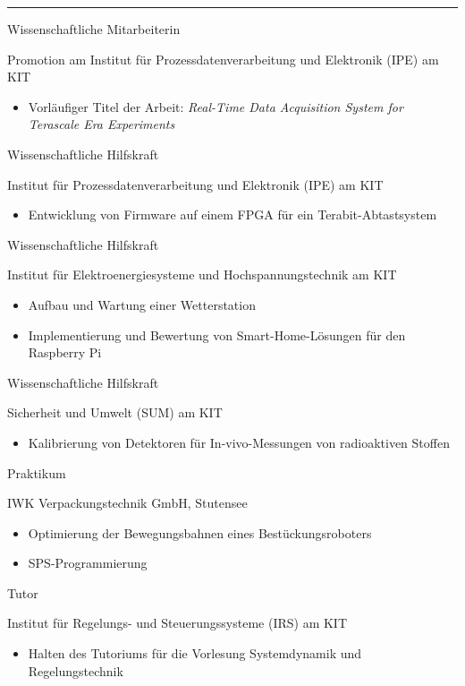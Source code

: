 \documentclass[a4paper,10pt]{article}
\newlength{\cvcolumngapwidth}
\newlength{\cvleftcolumnwidth}
\newlength{\cvrightcolumnwidth}
\newcommand{\cvsectionstyle}[1]{{\normalsize\textcolor{cvsectioncolor}{#1}}}
\newcommand{\cvtitlestyle}[1]{{\large\textcolor{cvtitlecolor}{#1}}}
\newcommand{\cvdurationstyle}[1]{{\small\textcolor{cvdurationcolor}{#1}}}
\newlength{\cvafteritemskipamount}
\newlength{\cvaftersectionskipamount}
\newlength{\cvaftertitleskipamount}
\newlength{\cvparskip}
\newcommand{\cvsection}[1]{
    \begin{minipage}[t][][b]{\cvleftcolumnwidth}
        \raggedleft\cvsectionstyle{#1}
    \end{minipage}%
    \hspace{\cvcolumngapwidth}%
    \begin{minipage}[t]{\cvrightcolumnwidth}
        \textcolor{cvrulecolor}{\rule{\cvrightcolumnwidth}{0.3mm}}
    \end{minipage}

    \vspace{\cvaftersectionskipamount}
}
\newcommand{\cvitem}[2]{
    \begin{minipage}[t]{\cvleftcolumnwidth}
    \strut\vspace*{-\baselineskip}\newline %
    \raggedleft #1
    \end{minipage}%
    \hspace{\cvcolumngapwidth}%
    \begin{minipage}[t]{\cvrightcolumnwidth}
        \setlength{\parskip}{\cvparskip}
        \strut\vspace*{-\baselineskip}\newline #2 %
    \end{minipage}

    \vspace{\cvafteritemskipamount}
}
\newcommand{\cvtitle}[1]{
    \cvtitlestyle{#1}

    \vspace{\cvaftertitleskipamount}
    \vspace{-\cvparskip}
}
\begin{document}
\cvsection{BERUFLICHE ERFAHRUNG}

\cvitem{\cvdurationstyle{April 2022 -- heute}}{\cvtitle{Wissenschaftliche Mitarbeiterin}
	Promotion am Institut für Prozessdatenverarbeitung und Elektronik (IPE) am KIT
	\begin{itemize}[leftmargin=*]
		\item Vorläufiger Titel der Arbeit: \textit{Real-Time Data Acquisition System for Terascale Era Experiments}
	\end{itemize}
}

\cvitem{\cvdurationstyle{September 2021 -- März 2022}}{\cvtitle{Wissenschaftliche Hilfskraft}
	Institut für Prozessdatenverarbeitung und Elektronik (IPE) am KIT
	\begin{itemize}[leftmargin=*]
		\item Entwicklung von Firmware auf einem FPGA für ein Terabit-Abtastsystem
	\end{itemize}
}

\cvitem{\cvdurationstyle{Mai 2017 -- Juni 2021}}{\cvtitle{Wissenschaftliche Hilfskraft}
	Institut für Elektroenergiesysteme und Hochspannungstechnik am KIT
	\begin{itemize}[leftmargin=*]
		\item Aufbau und Wartung einer Wetterstation
		\item Implementierung und Bewertung von Smart-Home-Lösungen für den Raspberry Pi
	\end{itemize}
}

\cvitem{\cvdurationstyle{Oktober 2018 -- Dezember 2019}}{\cvtitle{Wissenschaftliche Hilfskraft}
	Sicherheit und Umwelt (SUM) am KIT
	\begin{itemize}[leftmargin=*]
		\item Kalibrierung von Detektoren für In-vivo-Messungen von radioaktiven Stoffen
	\end{itemize}
}

\cvitem{\cvdurationstyle{April 2018 -- Juli 2018}}{\cvtitle{Praktikum}
	IWK Verpackungstechnik GmbH, Stutensee
	\begin{itemize}[leftmargin=*]
		\item Optimierung der Bewegungsbahnen eines Bestückungsroboters
		\item SPS-Programmierung
	\end{itemize}
}

\cvitem{\cvdurationstyle{April 2018 -- Juli 2018}}{\cvtitle{Tutor}
	Institut für Regelungs- und Steuerungssysteme (IRS) am KIT
	\begin{itemize}[leftmargin=*]
		\item Halten des Tutoriums für die Vorlesung \glqq Systemdynamik und Regelungstechnik\grqq
	\end{itemize}
}
\end{document}
